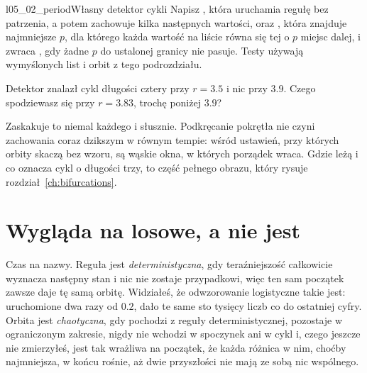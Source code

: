 \begin{lab}{l05_02_period}{Własny detektor cykli}
Napisz , która uruchamia regułę bez patrzenia, a potem zachowuje
kilka następnych wartości, oraz , która znajduje najmniejsze
$p$, dla którego każda wartość na liście równa się tej o $p$ miejsc dalej,
i zwraca , gdy żadne $p$ do ustalonej granicy nie pasuje. Testy
używają wymyślonych list i orbit z tego podrozdziału.
\end{lab}

\begin{think}
Detektor znalazł cykl długości cztery przy $r = \num{3.5}$ i nic przy
$\num{3.9}$. Czego spodziewasz się przy $r = \num{3.83}$, trochę poniżej
$\num{3.9}$?
\end{think}


\noindent
Zaskakuje to niemal każdego i słusznie. Podkręcanie pokrętła nie czyni
zachowania coraz dzikszym w równym tempie: wśród ustawień, przy których
orbity skaczą bez wzoru, są wąskie okna, w których porządek wraca. Gdzie
leżą i co oznacza cykl o długości trzy, to część pełnego obrazu, który
rysuje rozdział~\ref{ch:bifurcations}.

\section{Wygląda na losowe, a nie jest}
\label{sec:ch05-may}

\noindent
Czas na nazwy. Reguła jest \emph{deterministyczna}, gdy teraźniejszość
całkowicie wyznacza następny stan i nic nie zostaje przypadkowi, więc ten
sam początek zawsze daje tę samą orbitę. Widziałeś, że odwzorowanie
logistyczne takie jest: uruchomione dwa razy od $\num{0.2}$, dało te same
sto tysięcy liczb co do ostatniej cyfry. Orbita jest \emph{chaotyczna}, gdy
pochodzi z reguły deterministycznej, pozostaje w ograniczonym zakresie,
nigdy nie wchodzi w spoczynek ani w cykl \dash{} i, czego jeszcze nie
zmierzyłeś, jest tak wrażliwa na początek, że każda różnica w nim, choćby
najmniejsza, w końcu rośnie, aż dwie przyszłości nie mają ze sobą nic
wspólnego.

